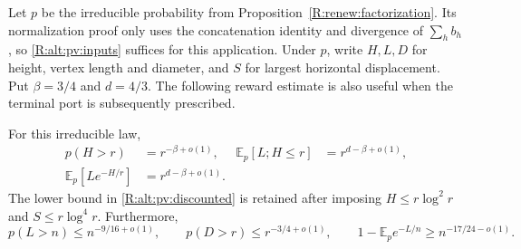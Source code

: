Let $p$ be the irreducible probability from
Proposition~\ref{R:renew:factorization}.  Its normalization proof only
uses the concatenation identity and divergence of $\sum_hb_h$, so
\eqref{R:alt:pv:inputs} suffices for this application.  Under $p$, write
$H,L,D$ for height,
vertex length and diameter, and $S$ for largest horizontal displacement.
Put $\beta=3/4$ and $d=4/3$.  The following reward estimate is also useful
when the terminal port is subsequently prescribed.

\begin{proposition}
\label{R:alt:pv:reward}
For this irreducible law,
\begin{align}
 p(H>r)&=r^{-\beta+o(1)},&
 \mathbb E_p[L;H\le r]&=r^{d-\beta+o(1)},
 \label{R:alt:pv:truncated}\\
 \mathbb E_p[Le^{-H/r}]&=r^{d-\beta+o(1)}.
 \label{R:alt:pv:discounted}
\end{align}
The lower bound in \eqref{R:alt:pv:discounted} is retained after imposing
$H\le r\log^2r$ and $S\le r\log^4r$.  Furthermore,
\begin{equation}\label{R:alt:pv:tails}
 p(L>n)\le n^{-9/16+o(1)},\qquad
 p(D>r)\le r^{-3/4+o(1)},\qquad
 1-\mathbb E_p e^{-L/n}\ge n^{-17/24-o(1)}.
\end{equation}
\end{proposition}
